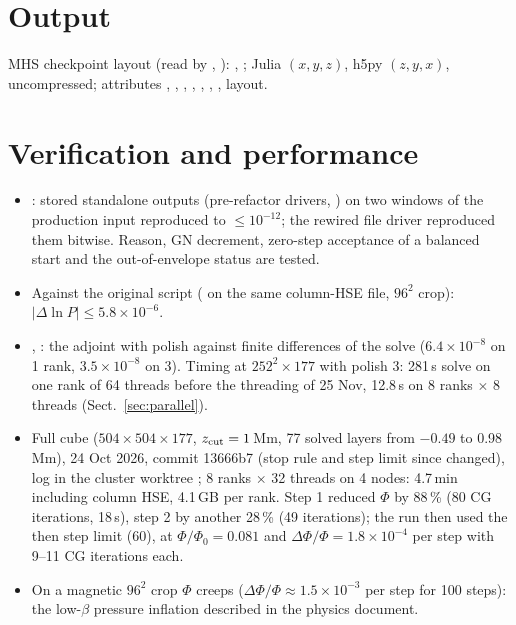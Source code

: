 \adjointpoissontrue


\section{Output}
MHS checkpoint layout (read by , ):
,
; Julia $(x,y,z)$, h5py $(z,y,x)$, uncompressed; attributes , ,
, , , , , layout.

\section{Verification and performance}
\begin{itemize}
\item {}: stored standalone outputs (pre-refactor drivers, ) on two windows of the
production input reproduced to $\le10^{-12}$; the rewired file driver reproduced them bitwise. Reason, GN decrement, zero-step
acceptance of a balanced start and the out-of-envelope status are tested.
\item Against the original script ( on the same column-HSE file, $96^2$ crop):
$|\Delta\ln P|\le5.8\times10^{-6}$.
\item {}, : the adjoint with polish against finite differences of the solve
($6.4\times10^{-8}$ on 1 rank, $3.5\times10^{-8}$ on 3). Timing at $252^2\times177$ with polish 3: 281\,s solve on one rank of 64
threads before the threading of 25 Nov, 12.8\,s on 8 ranks $\times$ 8 threads (Sect.~\ref{sec:parallel}).
\item Full cube ($504\times504\times177$, $z_{\rm cut}=1$\,Mm, 77 solved layers from $-0.49$ to 0.98\,Mm), 24 Oct 2026,
commit 13666b7 (stop rule and step limit since changed), log  in the cluster worktree
; 8 ranks $\times$ 32 threads on 4 nodes: 4.7\,min including column HSE, 4.1\,GB per rank. Step 1 reduced $\Phi$ by 88\,\% (80 CG iterations, 18\,s), step 2 by
another 28\,\% (49 iterations); the run then used the then step limit (60), at $\Phi/\Phi_0=0.081$ and
$\Delta\Phi/\Phi=1.8\times10^{-4}$ per step with 9--11 CG iterations each.
\item On a magnetic $96^2$ crop $\Phi$ creeps ($\Delta\Phi/\Phi\approx1.5\times10^{-3}$ per step for 100 steps): the
low-$\beta$ pressure inflation described in the physics document.
\end{itemize}

